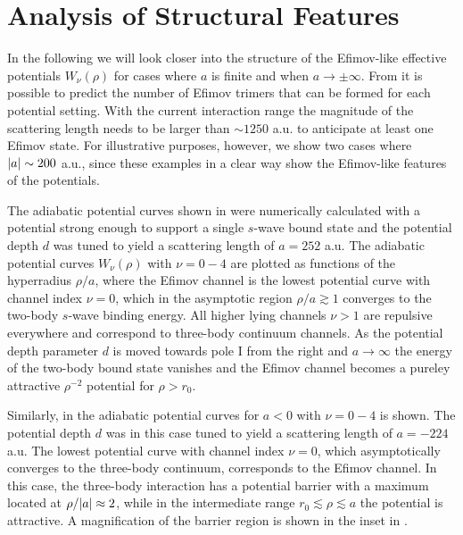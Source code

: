 \section{Analysis of Structural Features}
In the following we will look closer into the structure of the Efimov-like effective potentials $W_{\nu}(\rho)$ for cases where $a$ is finite and when $a \rightarrow \pm \infty$. From  it is possible to predict the number of Efimov trimers that can be formed for each potential setting. With the current interaction range the magnitude of the scattering length needs to be larger than $\sim 1250$ a.u. to anticipate at least one Efimov state. For illustrative purposes, however, we show two cases where $\lvert a\rvert \sim 200$ a.u., since these examples in a clear way show the Efimov-like features of the potentials.     

The adiabatic potential curves shown in  were numerically calculated with a potential strong enough to support a single $s$-wave bound state and the potential depth $d$ was tuned to yield a scattering length of $a=252$ a.u. The adiabatic potential curves $W_{\nu}(\rho)$ with $\nu = 0-4$ are plotted as functions of the hyperradius $\rho/a$, where the Efimov channel is the lowest potential curve with channel index $\nu = 0$, which in the asymptotic region $\rho/a\gtrsim1$ converges to the two-body $s$-wave binding energy. All higher lying channels $\nu>1$ are repulsive everywhere and correspond to three-body continuum channels. As the potential depth parameter $d$ is moved towards pole $\mathrm{I}$ from the right and $a \rightarrow \infty$ the energy of the two-body bound state vanishes and the Efimov channel becomes a pureley attractive $\rho^{-2}$ potential for $\rho>r_0$. 

Similarly, in  the adiabatic potential curves for $a<0$ with $\nu = 0-4$ is shown. The potential depth $d$ was in this case tuned to yield a scattering length of $a=-224$ a.u. The lowest potential curve with channel index $\nu = 0$, which asymptotically converges to the three-body continuum, corresponds to the Efimov channel. In this case, the three-body interaction has a potential barrier with a maximum located at $\rho/\lvert a\rvert \approx 2$, while in the intermediate range $r_0 \lesssim \rho \lesssim a$ the potential is attractive. A magnification of the barrier region is shown in the inset in . 

